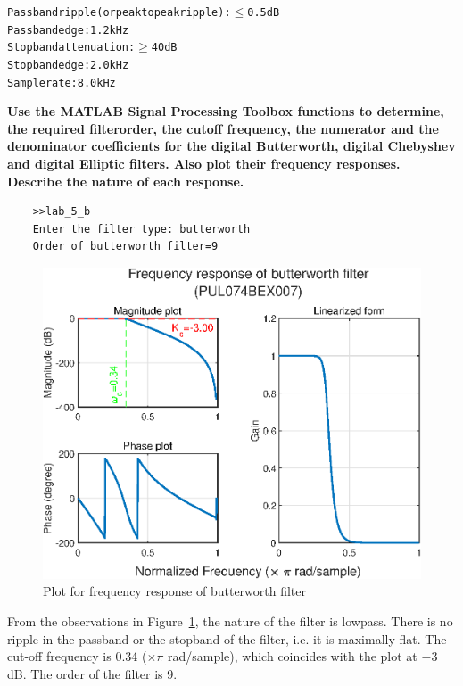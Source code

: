 \documentclass{lab_sheet}
\begin{document}
\begin{alltt}
    Pass band ripple (or peak to peak ripple):\ensuremath{\leq} 0.5 dB
    Pass band edge: 1.2 kHz
    Stop band attenuation:\ensuremath{\geq} 40 dB
    Stop band edge: 2.0 kHz
    Sample rate: 8.0 kHz
\end{alltt}
\textbf{Use the MATLAB Signal Processing Toolbox functions to determine, the required filterorder, the cutoff frequency, the numerator and the denominator coefficients for the dig­ital Butterworth, digital Chebyshev and digital Elliptic filters. Also plot their frequency responses. Describe the nature of each response.}
\pagebreak
{}
\begin{verbatim}
    >>lab_5_b         
    Enter the filter type: butterworth
    Order of butterworth filter=9
\end{verbatim}
\begin{figure}[H]
    \centering
    \includegraphics[width=0.9\linewidth]{../Figures/butterworth.eps}
    \caption{Plot for frequency response of butterworth filter}
    \label{fig:5_2_butter}
\end{figure}
From the observations in Figure~\ref{fig:5_2_butter}, the nature of the filter is lowpass. There is no ripple in the passband or the stopband of the filter, i.e. it is maximally flat. The cut-off frequency is 0.34 ($\times \pi$ rad/sample), which coincides with the plot at $-3$ dB. The order of the filter is 9.  
\end{document}
